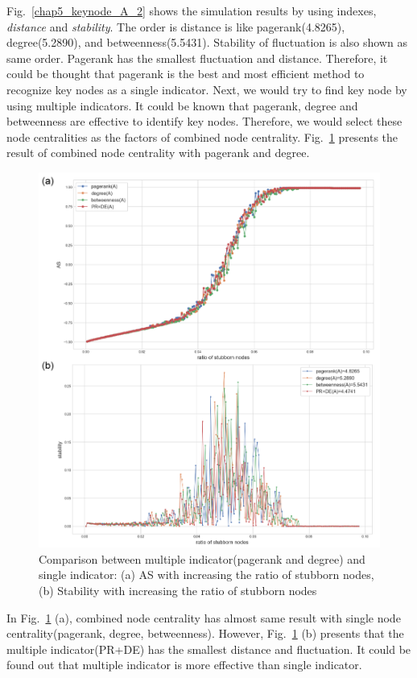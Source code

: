 Fig.~\ref{chap5_keynode_A_2} shows the simulation results by using indexes, \textit{distance} and \textit{stability}. The order is distance is like pagerank(4.8265), degree(5.2890), and betweenness(5.5431). Stability of fluctuation is also shown as same order. Pagerank has the smallest fluctuation and distance. Therefore, it could be thought that pagerank is the best and most efficient method to recognize key nodes as a single indicator.  
Next, we would try to find key node by using multiple indicators. It could be known that pagerank, degree and betweenness are effective to identify key nodes. Therefore, we would select these node centralities as the factors of combined node centrality.
Fig.~\ref{chap5_keynode_A_3} presents the result of combined node centrality with pagerank and degree. 
\begin{figure}[!htb]
	\centering
	\includegraphics[width=\hsize]{figure/chap5_keynode_A_3.png}
	\caption{Comparison between multiple indicator(pagerank and degree) and single indicator:
	(a) AS with increasing the ratio of stubborn nodes, (b) Stability with increasing the ratio of stubborn nodes}
	\label{chap5_keynode_A_3}
\end{figure}
In Fig.~\ref{chap5_keynode_A_3} (a), combined node centrality has almost same result with single node centrality(pagerank, degree, betweenness). However, Fig.~\ref{chap5_keynode_A_3} (b) presents that the multiple indicator(PR+DE) has the smallest distance and fluctuation. It could be found out that multiple indicator is more effective than single indicator.  




